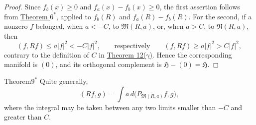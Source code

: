 ﻿\documentclass[paper=b5,fontsize=13pt,bookmarkpackage=false,twoside]{scrartcl}
\newcounter{translatornote}
\begin{document}
\begin{proof}
Since \(f_b(x)\geq0\) and \(f_a(x)-f_b(x)\geq0\), the first assertion
follows from \hyperref[thm:appII-6]{Theorem \(6^*\)}, applied to
\(f_b(R)\) and \(f_a(R)-f_b(R)\).  For the second, if a nonzero \(f\)
belonged, when \(a<-C\), to \(\mathfrak M(R,a)\), or, when \(a>C\),
to \(\mathfrak N(R,a)\), then
\[
  (f,Rf)\leq a|f|^2<-C|f|^2,
  \qquad\text{respectively}\qquad
  (f,Rf)\geq a|f|^2>C|f|^2,
\]
contrary to the definition of \(C\) in
\hyperref[thm:12]{Theorem 12(\(\gamma\))}.  Hence the corresponding
manifold is \((0)\), and its orthogonal complement is
\(\mathfrak H-(0)=\mathfrak H\).
\end{proof}

\begin{namedstatement}{Theorem}{\(9^*\)}
\label{thm:appII-9}
Quite generally,
\[
  (Rf,g)=\int a\,d\bigl(P_{\mathfrak M(R,a)}f,g\bigr),
\]
where the integral may be taken between any two limits smaller than
\(-C\) and greater than \(C\).
\end{namedstatement}
\end{document}

